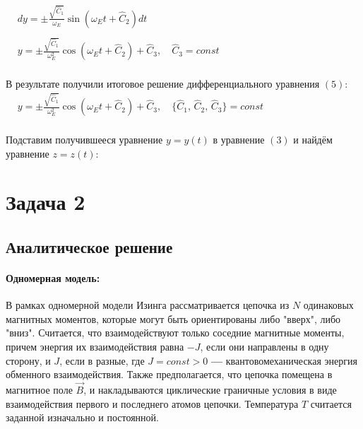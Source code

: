 \documentclass[oneside,final,14pt]{extarticle}
\begin{document}
		\begin{math}
			\begin{aligned}
				& dy = \pm \frac{\sqrt{\widehat{C}_1}}{\omega_{E}} \sin{(\omega_{E}t + \widehat{C}_{2})} dt \\\\
				& y = \pm \frac{\sqrt{\widehat{C}_1}}{\omega_{E}^{2}} \cos{(\omega_{E}t + \widehat{C}_{2})} + \widehat{C}_{3}, \quad \widehat{C}_{3} = const
			\end{aligned}
		\end{math} \\\\
		
		\noindent В результате получили итоговое решение дифференциального уравнения $(5)$: \\
		
		\begin{math}
			\begin{aligned}
				& y = \pm \frac{\sqrt{\widehat{C}_1}}{\omega_{E}^{2}} \cos{(\omega_{E}t + \widehat{C}_{2})} + \widehat{C}_{3}, \quad \{\widehat{C}_{1},\, \widehat{C}_{2},\, \widehat{C}_{3}\} = const
			\end{aligned}
		\end{math} \\\\
		
		\noindent Подставим получившееся уравнение $y = y(t)$ в уравнение $(3)$ и найдём уравнение $z = z(t)$:
		
	\newpage
	\section{Задача 2}
	\subsection{Аналитическое решение}
	\paragraph{Одномерная модель:}
	В рамках одномерной модели Изинга рассматривается цепочка из $N$ одинаковых магнитных моментов, которые могут быть ориентированы либо "вверх", либо "вниз". Считается, что взаимодействуют только соседние магнитные моменты, причем энергия их взаимодействия равна $-J$, если они направлены в одну сторону, и $J$, если в разные, где $J=const>0$ \textbf{---} квантовомеханическая энергия обменного взаимодействия. Также предполагается, что цепочка помещена в магнитное поле $\vec B$, и накладываются циклические граничные условия в виде взаимодействия первого и последнего атомов цепочки. Температура $T$ считается заданной изначально и постоянной. 
\end{document}
